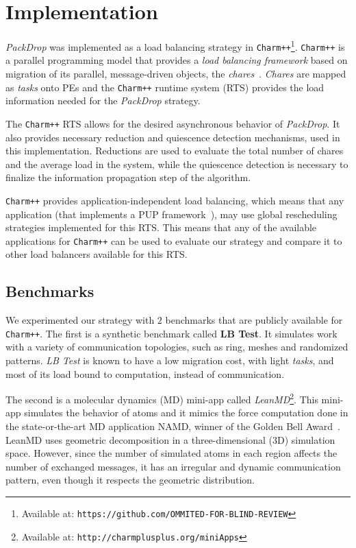 \section{Implementation}

\textit{PackDrop} was implemented as a load balancing strategy in \texttt{Charm++}\footnote{Available at: \texttt{https://github.com/OMMITED-FOR-BLIND-REVIEW}}.
\texttt{Charm++} is a parallel programming model that provides a \textit{load balancing framework} based on migration of its parallel, message-driven objects, the \textit{chares}~\cite{CharmLOTR}.
\textit{Chares} are mapped as \textit{tasks} onto PEs and the \texttt{Charm++} runtime system (RTS) provides the load information needed for the \textit{PackDrop} strategy.

The \texttt{Charm++} RTS allows for the desired asynchronous behavior of \textit{PackDrop}.
It also provides necessary reduction and quiescence detection mechanisms, used in this implementation.
Reductions are used to evaluate the total number of chares and the average load in the system, while the quiescence detection is necessary to finalize the information propagation step of the algorithm.

\texttt{Charm++} provides application-independent load balancing, which means that any application (that implements a PUP framework~\cite{sc14charm}), may use global rescheduling strategies implemented for this RTS.
This means that any of the available applications for \texttt{Charm++} can be used to evaluate our strategy and compare it to other load balancers available for this RTS.


\subsection{Benchmarks} \label{sec:benchmarks}

We experimented our strategy with $2$ benchmarks that are publicly available for \texttt{Charm++}.
The first is a synthetic benchmark called \textbf{LB Test}. 
It simulates work with a variety of communication topologies, such as ring, meshes and randomized patterns.
\textit{LB Test} is known to have a low migration cost, with light \textit{tasks}, and most of its load bound to computation, instead of communication.

The second is a molecular dynamics (MD) mini-app called \textit{LeanMD}\footnote{Available at: \texttt{http://charmplusplus.org/miniApps}}.
This mini-app simulates the behavior of atoms and it mimics the force computation done in the state-or-the-art MD application NAMD, winner of the Golden Bell Award~\cite{grapevine}.
LeanMD uses geometric decomposition in a three-dimensional ($3$D) simulation space.
However, since the number of simulated atoms in each region affects the number of exchanged messages, it has an irregular and dynamic communication pattern, even though it respects the geometric distribution.

